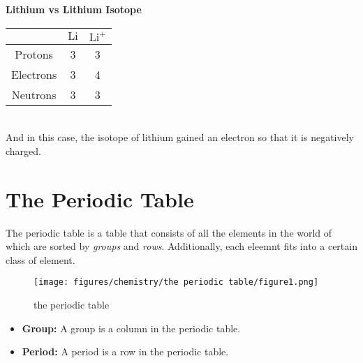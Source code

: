 \documentclass[12pt]{report}
\begin{document}
\begin{enumerate}
{\begin{table}[h!]
                    \begin{center}
                        \textbf{Lithium vs Lithium Isotope}\\
                        \vspace{0.5em}
                        \begin{tabular}{|c|c|c|} %
                        \hline
                          & $ \text{Li}$ & $ \text{Li}^{+}$ \\ %
                        \hline
                            Protons & 3 & 3 \\ %
                        \hline
                            Electrons & 3 & 4\\
                        \hline 
                            Neutrons & 3 & 3\\
                        \hline
                        \end{tabular}
                    \end{center}
                \end{table}\\
                And in this case, the isotope of lithium gained an electron so that it is negatively charged. 
            }
\end{enumerate}

\newpage
\section{The Periodic Table}
The periodic table is a table that consists of all the elements in the world of which are sorted by \textit{groups} and \textit{rows}. Additionally, each eleemnt fits into a certain class of element. 

\begin{figure}[htb!]
\centering
\texttt{[image: figures/chemistry/the periodic table/figure1.png]}
    \caption{the periodic table}
\end{figure}

\begin{itemize}
    \item{ \textbf{Group:} A group is a column in the periodic table.}
    \item{ \textbf{Period:} A period is a row in the periodic table.}
\end{itemize}
\end{document}
